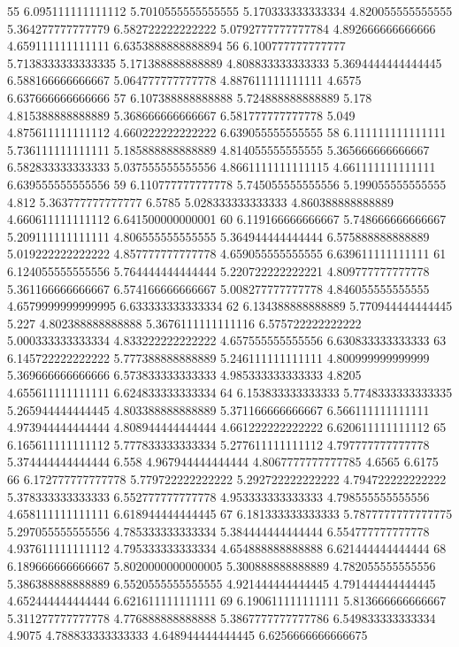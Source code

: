 55 6.095111111111112 5.7010555555555555 5.170333333333334 4.820055555555555 5.364277777777779 6.582722222222222 5.0792777777777784 4.892666666666666 4.659111111111111 6.6353888888888894
56 6.100777777777777 5.7138333333333335 5.171388888888889 4.808833333333333 5.3694444444444445 6.588166666666667 5.064777777777778 4.887611111111111 4.6575 6.637666666666666
57 6.107388888888888 5.724888888888889 5.178 4.815388888888889 5.368666666666667 6.581777777777778 5.049 4.875611111111112 4.660222222222222 6.639055555555555
58 6.111111111111111 5.736111111111111 5.185888888888889 4.814055555555555 5.365666666666667 6.582833333333333 5.037555555555556 4.8661111111111115 4.661111111111111 6.639555555555556
59 6.110777777777778 5.745055555555556 5.199055555555555 4.812 5.363777777777777 6.5785 5.028333333333333 4.860388888888889 4.660611111111112 6.641500000000001
60 6.119166666666667 5.748666666666667 5.209111111111111 4.806555555555555 5.364944444444444 6.575888888888889 5.019222222222222 4.857777777777778 4.659055555555555 6.639611111111111
61 6.124055555555556 5.764444444444444 5.220722222222221 4.809777777777778 5.361166666666667 6.574166666666667 5.008277777777778 4.846055555555555 4.6579999999999995 6.633333333333334
62 6.134388888888889 5.770944444444445 5.227 4.802388888888888 5.3676111111111116 6.575722222222222 5.000333333333334 4.833222222222222 4.657555555555556 6.630833333333333
63 6.145722222222222 5.777388888888889 5.246111111111111 4.800999999999999 5.369666666666666 6.573833333333333 4.985333333333333 4.8205 4.655611111111111 6.624833333333334
64 6.153833333333333 5.7748333333333335 5.265944444444445 4.803388888888889 5.371166666666667 6.566111111111111 4.973944444444444 4.808944444444444 4.661222222222222 6.620611111111112
65 6.165611111111112 5.777833333333334 5.277611111111112 4.797777777777778 5.374444444444444 6.558 4.967944444444444 4.8067777777777785 4.6565 6.6175
66 6.172777777777778 5.779722222222222 5.292722222222222 4.794722222222222 5.378333333333333 6.552777777777778 4.953333333333333 4.798555555555556 4.658111111111111 6.618944444444445
67 6.181333333333333 5.7877777777777775 5.297055555555556 4.785333333333334 5.384444444444444 6.554777777777778 4.937611111111112 4.795333333333334 4.654888888888888 6.621444444444444
68 6.189666666666667 5.8020000000000005 5.300888888888889 4.782055555555556 5.386388888888889 6.5520555555555555 4.921444444444445 4.791444444444445 4.652444444444444 6.621611111111111
69 6.190611111111111 5.813666666666667 5.311277777777778 4.776888888888888 5.3867777777777786 6.549833333333334 4.9075 4.788833333333333 4.648944444444445 6.6256666666666675
